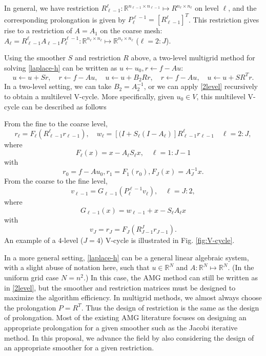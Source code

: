 In general, we have restriction $R_{\ell-1}^\ell:\mathbb
R^{n_{\ell-1}\times n_{\ell-1}}\mapsto R^{n_{\ell}\times n_{\ell}}$ on
level $\ell$, and the corresponding prolongation is given by
$P_\ell^{\ell-1}=[R_{\ell-1}^\ell]^T$.  This restriction gives rise
to a restriction of $A=A_1$ on the coarse mesh:
$A_\ell=R_{\ell-1}^\ell A_{\ell-1}P_\ell^{\ell-1}: \mathbb
R^{n_\ell\times n_\ell}\mapsto \mathbb R^{n_\ell\times n_\ell}$
($\ell=2:J$).

Using the smoother $S$ and restriction $R$ above, a two-level
multigrid method for solving \eqref{laplace-h} can be written as
$u\leftarrow u_0, r\leftarrow f-Au$:
\begin{equation}
\label{2level}
u\leftarrow u+ Sr, \quad r\leftarrow f-Au, \quad u\leftarrow u+ B_2Rr,
\quad r\leftarrow f-Au, \quad u\leftarrow u+S R^Tr.
\end{equation}
In a two-level setting, we can take $B_2=A_2^{-1}$, or we can apply
\eqref{2level} recursively to obtain a multilevel V-cycle.     More
specifically, given $u_0\in V$,  this multilevel V-cycle can be
described as follows

From the fine to the coarse level, 
\begin{equation}\label{multi-backslash}
r_\ell = F_\ell (R^\ell_{\ell - 1} r_{\ell-1}), \quad 
w_\ell =[(I+S_{\ell}(I - A_{\ell} )]R^{\ell}_{\ell-1} r_{\ell-1}\quad \ell = 2:J,
\end{equation}
where
\begin{equation}\label{eq:backslash}
F_\ell (x) = x - A_\ell S_\ell x, \quad \ell = 1:J-1
\end{equation}
with 
$$
r_0=f-Au_0, r_1 = F_1(r_0),  F_J(x) = A_J^{-1}x.
$$ 
From the coarse to the fine level, 
\begin{equation}\label{multi-slash}
v_{\ell-1} = G_{\ell-1} (P^{\ell-1}_{\ell} v_{\ell}), \quad \ell = J:2,
\end{equation}
where
\begin{equation}\label{eq:slash}
G_{\ell-1} (x) = w_{\ell-1} + x - S_\ell A_\ell x
\end{equation}
with
$$
v_J = r_J = F_J(R^J_{J-1} r_{J-1}).
$$ 
An example of a $4$-level ($J=4$) V-cycle is illustrated in
Fig. \ref{fig:V-cycle}.

In a more general setting, \eqref{laplace-h} can be a general linear
algebraic system, with a slight abuse of notation here, such that
$u\in \mathbb R^N$ and $A: \mathbb R^N\mapsto \mathbb R^N$.  (In the
uniform grid case $N=n^2$.)  In this case, the AMG method can still be
written as in \eqref{2level}, but the smoother and restriction
matrices must be designed to maximize the algorithm efficiency.  In
multigrid methods, we almost always choose the prolongation
$P=R^T$. Thus the design of restriction is the same as the design of
prolongation.  Most of the existing AMG literature focuses on
designing an appropriate prolongation for a given smoother such as the
Jacobi iterative method.  In this proposal, we advance the field by
also considering the design of an appropriate smoother for a given
restriction.





